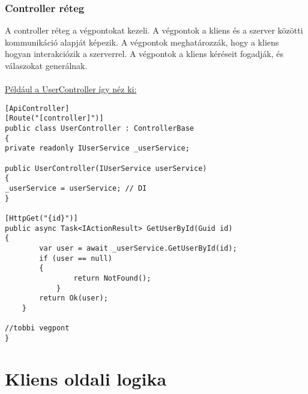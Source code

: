 \subsubsection*{Controller réteg}
A controller réteg a végpontokat kezeli. A végpontok a kliens és a szerver közötti kommunikáció alapját képezik. A végpontok meghatározzák, hogy a kliens hogyan interakciózik a szerverrel. A végpontok a kliens kéréseit fogadják, és válaszokat generálnak.
\\
\\
\underline{Például a UserController így néz ki:}
\begin{lstlisting}[language=CSharp,style=CSharpBase,caption={User Controller}]
[ApiController]
[Route("[controller]")]
public class UserController : ControllerBase
{
private readonly IUserService _userService;

public UserController(IUserService userService)
{
_userService = userService; // DI
}

[HttpGet("{id}")]
public async Task<IActionResult> GetUserById(Guid id)
{
        var user = await _userService.GetUserById(id);
        if (user == null)
        {
                return NotFound();
            }
        return Ok(user);
    }

//tobbi vegpont
}
\end{lstlisting}

\section*{Kliens oldali logika}

